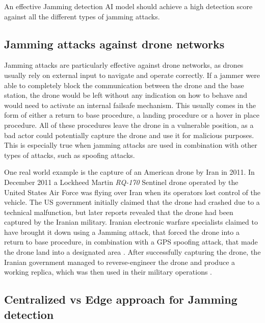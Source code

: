 \documentclass[futureinternet,article,submit,pdftex,moreauthors]{Definitions/mdpi}
\begin{document}
An effective Jamming detection AI model should achieve a high detection score against all the different types of jamming attacks.

\subsection{Jamming attacks against drone networks}\label{JammingDroneNetworks}

Jamming attacks are particularly effective against drone networks, as drones usually rely on external input to navigate and operate correctly.
If a jammer were able to completely block the communication between the drone and the base station, the drone would be left without any indication on how to behave and would need to activate an internal failsafe mechanism. 
This usually comes in the form of either a return to base procedure, a landing procedure or a hover in place procedure.
All of these procedures leave the drone in a vulnerable position, as a bad actor could potentially capture the drone and use it for malicious purposes.
This is especially true when jamming attacks are used in combination with other types of attacks, such as spoofing attacks. 

One real world example is the capture of an American drone by Iran in 2011. 
In December 2011 a Lockheed Martin \textit{RQ-170} Sentinel drone operated by the United States Air Force was flying over Iran when its operators lost control of the vehicle. The US government initially claimed that the drone had crashed due to a technical malfunction, but later reports revealed that the drone had been captured by the Iranian military. 
Iranian electronic warfare specialists claimed to have brought it down using a Jamming attack, that forced the drone into a return to base procedure, in combination with a  GPS spoofing attack, that made the drone land into a designated area \cite{RQ170DroneOwano}. 
After successfully capturing the drone, the Iranian government managed to reverse-engineer the drone and produce a working replica, which was then used in their military operations \cite{IranianUAVGross}.

\subsection{Centralized vs Edge approach for Jamming detection}
\end{document}
